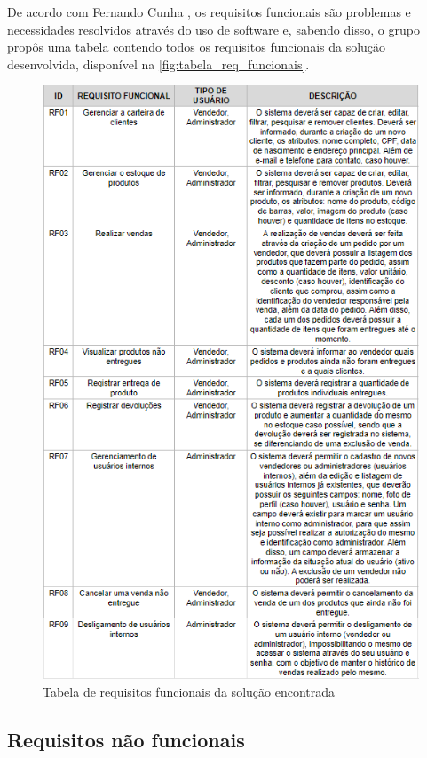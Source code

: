 \documentclass[serif, english, brazilian, oneside]{uffstex}
\begin{document}
De acordo com Fernando Cunha \cite{requisitos-o-que-sao}, os requisitos funcionais são problemas e necessidades resolvidos através do uso de software e, sabendo disso, o grupo propôs uma tabela contendo todos os requisitos funcionais da solução desenvolvida, disponível na \autoref{fig:tabela_req_funcionais}.

\newpage

\begin{figure}[!htpb]
    \centering
    \caption{Tabela de requisitos funcionais da solução encontrada}
    \label{fig:tabela_req_funcionais}
    \includegraphics[width=0.9\linewidth]{imagens/tabela_req_funcionais.png}
\end{figure}

\subsection{Requisitos não funcionais}
\end{document}
